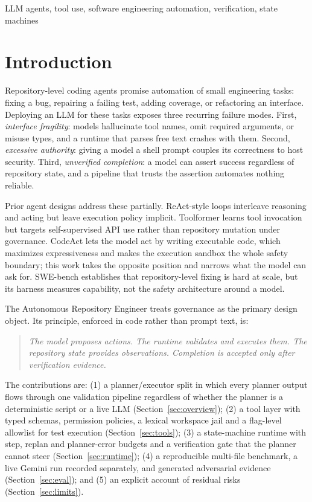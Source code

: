 \documentclass[conference]{IEEEtran}
\begin{document}
\begin{IEEEkeywords}
LLM agents, tool use, software engineering automation, verification, state machines
\end{IEEEkeywords}

\section{Introduction}
Repository-level coding agents promise automation of small engineering
tasks: fixing a bug, repairing a failing test, adding coverage, or
refactoring an interface. Deploying an LLM for these tasks exposes three
recurring failure modes. First, \emph{interface fragility}: models
hallucinate tool names, omit required arguments, or misuse types, and a
runtime that parses free text crashes with them. Second, \emph{excessive
authority}: giving a model a shell prompt couples its correctness to host
security. Third, \emph{unverified completion}: a model can assert success
regardless of repository state, and a pipeline that trusts the assertion
automates nothing reliable.

Prior agent designs address these partially. ReAct-style loops
\cite{yao2023react} interleave reasoning and acting but leave execution
policy implicit. Toolformer \cite{schick2023toolformer} learns tool
invocation but targets self-supervised API use rather than repository
mutation under governance. CodeAct \cite{wang2024codeact} lets the model act
by writing executable code, which maximizes expressiveness and makes the
execution sandbox the whole safety boundary; this work takes the opposite
position and narrows what the model can ask for. SWE-bench
\cite{jimenez2024swebench} establishes that repository-level fixing is hard
at scale, but its harness measures capability, not the safety architecture
around a model.

The Autonomous Repository Engineer treats governance as the primary design
object. Its principle, enforced in code rather than prompt text, is:

\begin{quote}
\emph{The model proposes actions. The runtime validates and executes them.
The repository state provides observations. Completion is accepted only
after verification evidence.}
\end{quote}

The contributions are: (1) a planner/executor split in which every planner
output flows through one validation pipeline regardless of whether the
planner is a deterministic script or a live LLM
(Section~\ref{sec:overview}); (2) a tool layer with typed schemas,
permission policies, a lexical workspace jail and a flag-level allowlist for
test execution (Section~\ref{sec:tools}); (3) a state-machine runtime with
step, replan and planner-error budgets and a verification gate that the
planner cannot steer (Section~\ref{sec:runtime}); (4) a reproducible
multi-file benchmark, a live Gemini run recorded separately, and generated
adversarial evidence (Section~\ref{sec:eval}); and (5) an explicit account
of residual risks (Section~\ref{sec:limits}).
\end{document}
